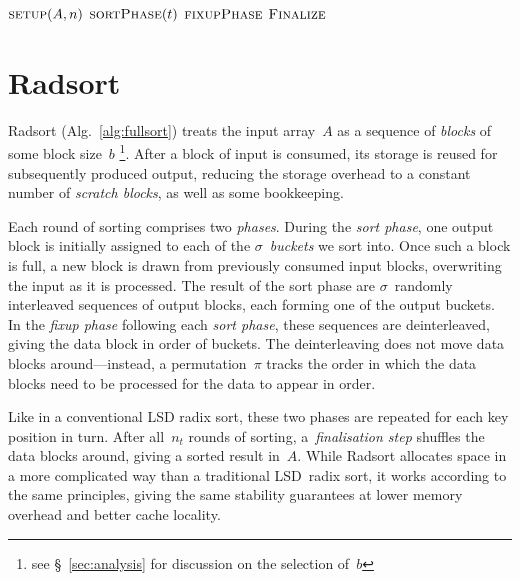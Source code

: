 \documentclass[nolineno,a4paper,UKenglish,cleveref, autoref, thm-restate]{socg-lipics-v2021}
\begin{document}
\begin{algorithm}
\caption{the Radsort algorithm} \label{alg:fullsort}
\begin{algorithmic}[1]
\State$\Call{setup}{A,n}$
 \State$\Call{sortPhase}{t}$
 \State$\Call{fixupPhase}{}$
\EndFor
\State$\Call{Finalize}{}$
\EndProcedure
\end{algorithmic}
\end{algorithm}

\section{Radsort} \label{sec:radsort}
Radsort (Alg.~\ref{alg:fullsort})
treats the input array~$A$ as a sequence of \emph{blocks} of some block size~$b$%
\footnote{see \S~\ref{sec:analysis} for discussion on the selection of~$b$}.
After a block of input is consumed, its storage is reused for subsequently
produced output, reducing the storage overhead to a constant number of
\emph{scratch blocks}, as well as some bookkeeping.

Each round of sorting comprises two \emph{phases}.
During the \emph{sort phase}, one output block is initially assigned to each of the
$\sigma$~\emph{buckets} we sort into.  Once such a block is full, a new block
is drawn from previously consumed input blocks, overwriting the input as it is processed.
The result of the sort phase are $\sigma$~randomly interleaved sequences of output blocks,
each forming one of the output buckets.
In the \emph{fixup phase} following each \emph{sort phase}, these sequences are
deinterleaved, giving the data block in order of buckets.
The deinterleaving does not move data blocks around---instead, a permutation~$\pi$
tracks the order in which the data blocks need to be processed for the data to appear
in order.

Like in a conventional LSD radix sort, these two phases are repeated for each key
position in turn.
After all~$n_t$ rounds of sorting, a~\emph{finalisation step} shuffles the data
blocks around, giving a sorted result in~$A$.  While Radsort allocates space in a
more complicated way than a traditional LSD~radix sort, it works according to the
same principles, giving the same stability guarantees at lower memory overhead and
better cache locality.
\end{document}
